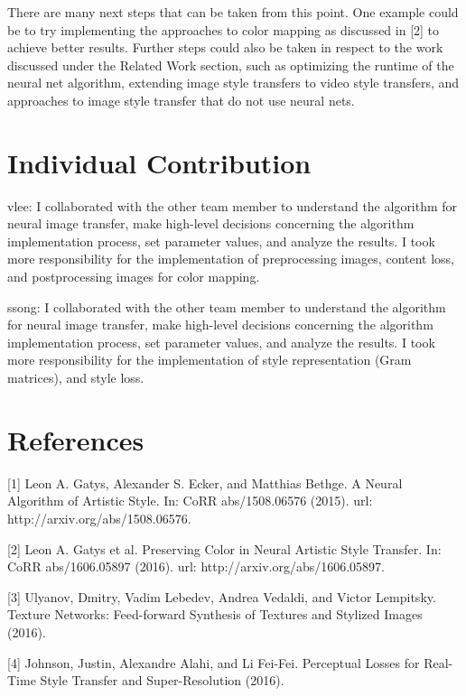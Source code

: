 \documentclass[10pt,twocolumn,letterpaper]{article}
\begin{document}
There are many next steps that can be taken from this point. One example could be to try implementing the approaches to color mapping as discussed in [2] to achieve better results. Further steps could also be taken in respect to the work discussed under the Related Work section, such as optimizing the runtime of the neural net algorithm, extending image style transfers to video style transfers, and approaches to image style transfer that do not use neural nets.

\section{Individual Contribution}

vlee: I collaborated with the other team member to understand the algorithm for neural image transfer, make high-level decisions concerning the algorithm implementation process, set parameter values, and analyze the results. I took more responsibility for the implementation of preprocessing images, content loss, and postprocessing images for color mapping.

ssong: I collaborated with the other team member to understand the algorithm for neural image transfer, make high-level decisions concerning the algorithm implementation process, set parameter values, and analyze the results. I took more responsibility for the implementation of style representation (Gram matrices), and style loss.

\section{References}

[1] Leon A. Gatys, Alexander S. Ecker, and Matthias Bethge. A Neural Algorithm of Artistic Style. In: CoRR abs/1508.06576 (2015). url: http://arxiv.org/abs/1508.06576.

[2] Leon A. Gatys et al. Preserving Color in Neural Artistic Style Transfer. In: CoRR abs/1606.05897 (2016). url: http://arxiv.org/abs/1606.05897.

[3] Ulyanov, Dmitry, Vadim Lebedev, Andrea Vedaldi, and Victor Lempitsky. Texture Networks: Feed-forward Synthesis of Textures and Stylized Images (2016).

[4] Johnson, Justin, Alexandre Alahi, and Li Fei-Fei. Perceptual Losses for Real-Time Style Transfer and Super-Resolution (2016).
\end{document}
